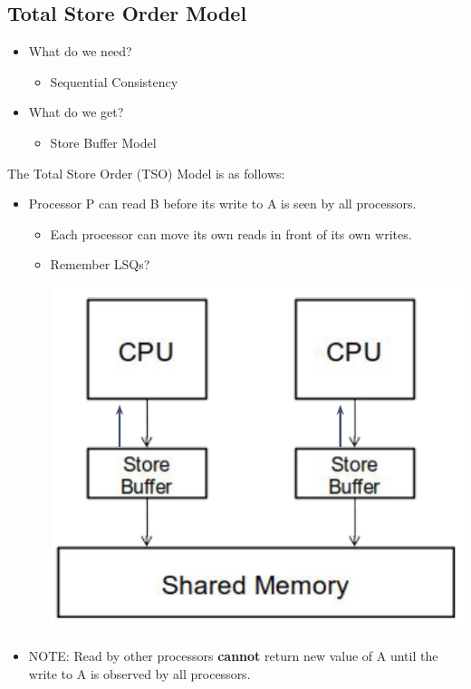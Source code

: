 \documentclass[10pt]{article}
\begin{document}
\subsection*{Total Store Order Model}
\begin{itemize}
    \item What do we need?  
    \begin{itemize}
        \item Sequential Consistency
    \end{itemize}
    \item What do we get?
    \begin{itemize}
        \item Store Buffer Model
    \end{itemize}
\end{itemize}
The Total Store Order (TSO) Model is as follows:
\begin{itemize}
    \item Processor P can read B before its write to A is seen by all processors.
    \begin{itemize}
        \item Each processor can move its own reads in front of its own writes.
        \item Remember LSQs?
        \begin{center}
            \includegraphics*[scale=0.6]{W9_2.png}
        \end{center}
    \end{itemize}
    \item NOTE: Read by other processors \textbf{cannot} return new value of A until the write to A is observed by all processors.
\end{itemize}
\end{document}

